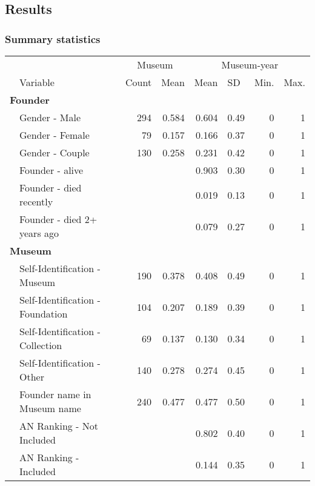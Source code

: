 \documentclass[12pt]{article}
\begin{document}
\subsection*{Results}


\subsubsection*{Summary statistics}


\begin{table}[ht]
\centering
\begin{tabular}{llrrrrrr}
  \hline
 & & \multicolumn{2}{c}{Museum} & \multicolumn{4}{c}{Museum-year} \\ 
\cmidrule(r){3-4}\cmidrule(r){5-8} \multicolumn{1}{l}{} & \multicolumn{1}{l}{Variable} & \multicolumn{1}{l}{Count} & \multicolumn{1}{l}{Mean} & \multicolumn{1}{l}{Mean} & \multicolumn{1}{l}{SD} & \multicolumn{1}{l}{Min.} & \multicolumn{1}{l}{Max.}\\ 
 \hline
  \multicolumn{8}{l}{\textbf{Founder}} \\ 
 & Gender - Male & 294 & 0.584 & 0.604 & 0.49 & 0 & 1 \\ 
   & Gender - Female & 79 & 0.157 & 0.166 & 0.37 & 0 & 1 \\ 
   & Gender - Couple & 130 & 0.258 & 0.231 & 0.42 & 0 & 1 \\ 
   & Founder - alive &  &  & 0.903 & 0.30 & 0 & 1 \\ 
   & Founder - died recently &  &  & 0.019 & 0.13 & 0 & 1 \\ 
   & Founder - died 2+ years ago &  &  & 0.079 & 0.27 & 0 & 1 \\ 
   \multicolumn{8}{l}{\textbf{Museum}} \\ 
 & Self-Identification - Museum & 190 & 0.378 & 0.408 & 0.49 & 0 & 1 \\ 
   & Self-Identification - Foundation & 104 & 0.207 & 0.189 & 0.39 & 0 & 1 \\ 
   & Self-Identification - Collection & 69 & 0.137 & 0.130 & 0.34 & 0 & 1 \\ 
   & Self-Identification - Other & 140 & 0.278 & 0.274 & 0.45 & 0 & 1 \\ 
   & Founder name in Museum name & 240 & 0.477 & 0.477 & 0.50 & 0 & 1 \\ 
   & AN Ranking - Not Included &  &  & 0.802 & 0.40 & 0 & 1 \\ 
   & AN Ranking - Included &  &  & 0.144 & 0.35 & 0 & 1 \\ 

\end{tabular}
\end{table}
\end{document}
